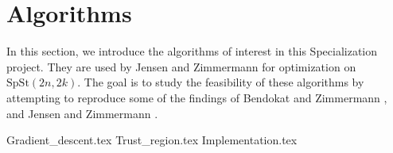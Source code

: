 \section{Algorithms}
In this section, we introduce the algorithms of interest in this Specialization project. They are used by Jensen and Zimmermann for optimization on $\mathrm{SpSt}(2n, 2k)$. The goal is to study the feasibility of these algorithms by attempting to reproduce some of the findings of Bendokat and Zimmermann \cite{BendokatZimmermann2021}, and Jensen and Zimmermann \cite{JensenZimmermann2024}. 

{Gradient_descent.tex}
{Trust_region.tex}
{Implementation.tex}